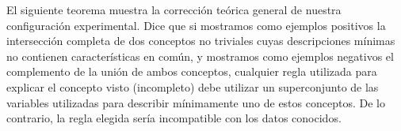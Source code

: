 El siguiente teorema muestra la corrección teórica general de nuestra configuración experimental. Dice que si mostramos como ejemplos positivos la intersección completa de dos conceptos no triviales cuyas descripciones mínimas no contienen características en común, y mostramos como ejemplos negativos el complemento de la unión de ambos conceptos, cualquier regla utilizada para explicar el concepto visto (incompleto) debe utilizar un superconjunto de las variables utilizadas para describir mínimamente uno de estos conceptos. De lo contrario, la regla elegida sería incompatible con los datos conocidos.

